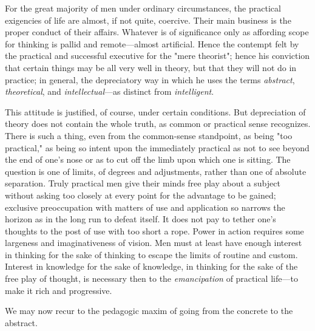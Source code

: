 \documentclass[showtrims,ustradepaper]{memoir}
\begin{document}

For the great majority of men under ordinary circumstances, the
practical exigencies of life are almost, if not quite, coercive. Their
main business is the proper conduct of their affairs. Whatever is of
significance only as affording scope for thinking is pallid and
remote---almost artificial. Hence the contempt felt by the practical and
successful executive for the "mere theorist"; hence his conviction that
certain things may be all very well in theory, but that they will not do
in practice; in general, the depreciatory way in which he uses the terms
\emph{abstract}, \emph{theoretical}, and \emph{intellectual}---as
distinct from \emph{intelligent}.


This attitude is justified, of course, under certain conditions. But
depreciation of theory does not contain the whole truth, as common or
practical sense recognizes. There is such a thing, even from the
common-sense standpoint, as being "too practical," as being so intent
upon the immediately practical as not to
see
beyond the end of one's nose or as to cut off the limb upon which one is
sitting. The question is one of limits, of degrees and adjustments,
rather than one of absolute separation. Truly practical men give their
minds free play about a subject without asking too closely at every
point for the advantage to be gained; exclusive preoccupation with
matters of use and application so narrows the horizon as in the long run
to defeat itself. It does not pay to tether one's thoughts to the post
of use with too short a rope. Power in action requires some largeness
and imaginativeness of vision. Men must at least have enough interest in
thinking for the sake of thinking to escape the limits of routine and
custom. Interest in knowledge for the sake of knowledge, in thinking for
the sake of the free play of thought, is necessary then to the
\emph{emancipation} of practical life---to make it rich and progressive.

We may now recur to the pedagogic maxim of going from the concrete to
the abstract.

\end{document}
